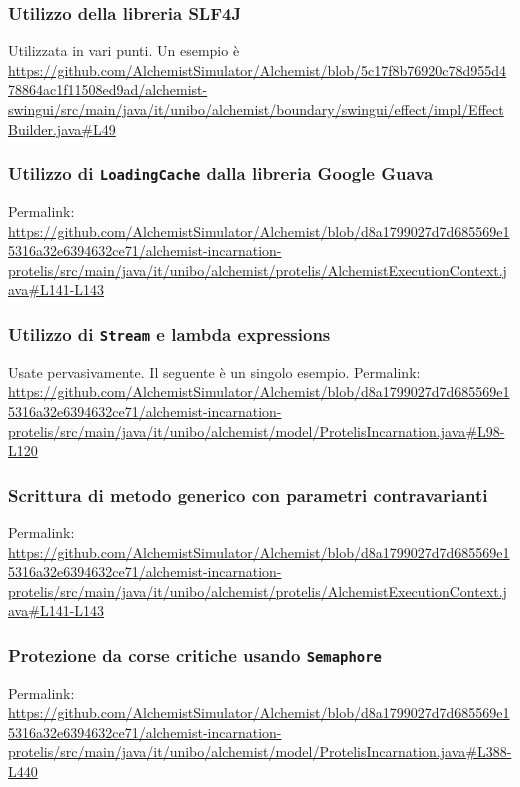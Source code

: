 \documentclass[a4paper,12pt]{report}
\begin{document}
\subsubsection{Utilizzo della libreria SLF4J}

Utilizzata in vari punti.
Un esempio è \url{https://github.com/AlchemistSimulator/Alchemist/blob/5c17f8b76920c78d955d478864ac1f11508ed9ad/alchemist-swingui/src/main/java/it/unibo/alchemist/boundary/swingui/effect/impl/EffectBuilder.java#L49}

\subsubsection{Utilizzo di \texttt{LoadingCache} dalla libreria Google Guava}

Permalink: \url{https://github.com/AlchemistSimulator/Alchemist/blob/d8a1799027d7d685569e15316a32e6394632ce71/alchemist-incarnation-protelis/src/main/java/it/unibo/alchemist/protelis/AlchemistExecutionContext.java#L141-L143}

\subsubsection{Utilizzo di \texttt{Stream} e lambda expressions}

Usate pervasivamente. Il seguente è un singolo esempio.
Permalink: \url{https://github.com/AlchemistSimulator/Alchemist/blob/d8a1799027d7d685569e15316a32e6394632ce71/alchemist-incarnation-protelis/src/main/java/it/unibo/alchemist/model/ProtelisIncarnation.java#L98-L120}

\subsubsection{Scrittura di metodo generico con parametri contravarianti}

Permalink: \url{https://github.com/AlchemistSimulator/Alchemist/blob/d8a1799027d7d685569e15316a32e6394632ce71/alchemist-incarnation-protelis/src/main/java/it/unibo/alchemist/protelis/AlchemistExecutionContext.java#L141-L143}

\subsubsection{Protezione da corse critiche usando \texttt{Semaphore}}

Permalink: \url{https://github.com/AlchemistSimulator/Alchemist/blob/d8a1799027d7d685569e15316a32e6394632ce71/alchemist-incarnation-protelis/src/main/java/it/unibo/alchemist/model/ProtelisIncarnation.java#L388-L440}
\end{document}
